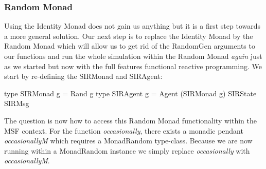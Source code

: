 \subsubsection{Random Monad}
Using the Identity Monad does not gain us anything but it is a first step towards a more general solution. Our next step is to replace the Identity Monad by the Random Monad which will allow us to get rid of the RandomGen arguments to our functions and run the whole simulation within the Random Monad \textit{again} just as we started but now with the full features functional reactive programming.
We start by re-defining the SIRMonad and SIRAgent:

\begin{HaskellCode}
type SIRMonad g = Rand g
type SIRAgent g = Agent (SIRMonad g) SIRState SIRMsg
\end{HaskellCode}

The question is now how to access this Random Monad functionality within the MSF context. For the function \textit{occasionally}, there exists a monadic pendant \textit{occasionallyM} which requires a MonadRandom type-class. Because we are now running within a MonadRandom instance we simply replace \textit{occasionally} with \textit{occasionallyM}. 

